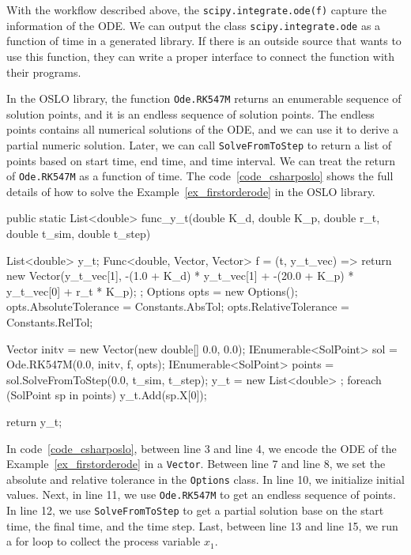 With the workflow described above, the \verb|scipy.integrate.ode(f)| capture the information of the ODE. We can output the class \verb|scipy.integrate.ode| as a function of time in a generated library. If there is an outside source that wants to use this function, they can write a proper interface to connect the function with their programs. 

In the OSLO library, the function \verb|Ode.RK547M| returns an enumerable sequence of solution points, and it is an endless sequence of solution points. The endless points contains all numerical solutions of the ODE, and we can use it to derive a partial numeric solution. Later, we can call \verb|SolveFromToStep| to return a list of points based on start time, end time, and time interval. We can treat the return of \verb|Ode.RK547M| as a function of time. The code~\ref{code_csharposlo} shows the full details of how to solve the Example~\ref{ex_firstorderode} in the OSLO library.

\begin{listing}[ht]
\begin{csharp1}
public static List<double> func_y_t(double K_d, double K_p, double r_t, double t_sim, double t_step) {
    List<double> y_t;
    Func<double, Vector, Vector> f = (t, y_t_vec) => {
        return new Vector(y_t_vec[1], -(1.0 + K_d) * y_t_vec[1] + -(20.0 + K_p) * y_t_vec[0] + r_t * K_p);
    };
    Options opts = new Options();
    opts.AbsoluteTolerance = Constants.AbsTol;
    opts.RelativeTolerance = Constants.RelTol;
    
    Vector initv = new Vector(new double[] {0.0, 0.0});
    IEnumerable<SolPoint> sol = Ode.RK547M(0.0, initv, f, opts);
    IEnumerable<SolPoint> points = sol.SolveFromToStep(0.0, t_sim, t_step);
    y_t = new List<double> {};
    foreach (SolPoint sp in points) {
        y_t.Add(sp.X[0]);
    }
    
    return y_t;
}
\end{csharp1}
\label{code_csharposlo}
\end{listing}

In code~\ref{code_csharposlo}, between line 3 and line 4, we encode the ODE of the Example~\ref{ex_firstorderode} in a \verb|Vector|. Between line 7 and line 8, we set the absolute and relative tolerance in the \verb|Options| class. In line 10, we initialize initial values. Next, in line 11, we use \verb|Ode.RK547M| to get an endless sequence of points. In line 12, we use \verb|SolveFromToStep| to get a partial solution base on the start time, the final time, and the time step. Last, between line 13 and line 15, we run a for loop to collect the process variable $x_1$.

